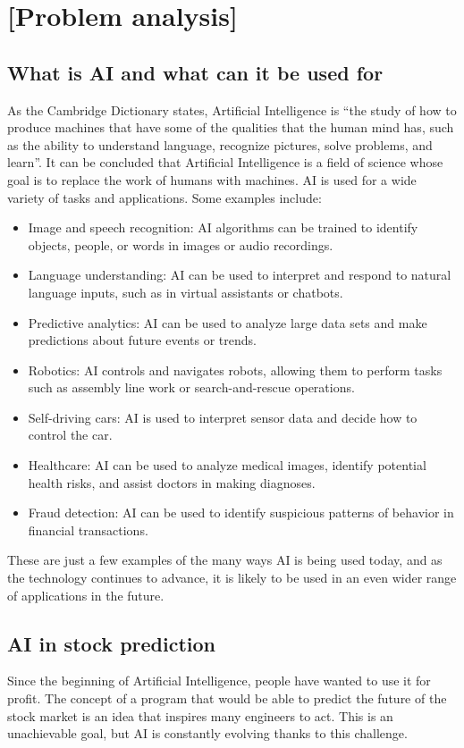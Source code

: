 \chapter{[Problem analysis]}

\section*{What is AI and what can it be used for}
As the Cambridge Dictionary states, Artificial Intelligence is “the study of how to produce machines that have some of the qualities that the human mind has, such as the ability to understand language, recognize pictures, solve problems, and learn”. It can be concluded that Artificial Intelligence is a field of science whose goal is to replace the work of humans with machines.
AI is used for a wide variety of tasks and applications. Some examples include:
\begin{itemize}
    \item Image and speech recognition: AI algorithms can be trained to identify objects, people, or words in images or audio recordings.
    \item Language understanding: AI can be used to interpret and respond to natural language inputs, such as in virtual assistants or chatbots.
    \item Predictive analytics: AI can be used to analyze large data sets and make predictions about future events or trends.
    \item Robotics: AI controls and navigates robots, allowing them to perform tasks such as assembly line work or search-and-rescue operations.
    \item Self-driving cars: AI is used to interpret sensor data and decide how to control the car.
    \item Healthcare: AI can be used to analyze medical images, identify potential health risks, and assist doctors in making diagnoses.
    \item Fraud detection: AI can be used to identify suspicious patterns of behavior in financial transactions.
\end{itemize} 
These are just a few examples of the many ways AI is being used today, and as the technology continues to advance, it is likely to be used in an even wider range of applications in the future.

\section*{AI in stock prediction}
Since the beginning of Artificial Intelligence, people have wanted to use it for profit. The concept of a program that would be able to predict the future of the stock market is an idea that inspires many engineers to act. This is an unachievable goal, but AI is constantly evolving thanks to this challenge.

